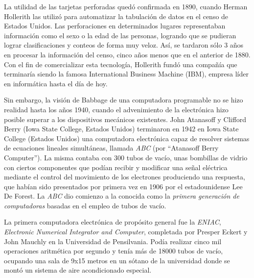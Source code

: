 \documentclass[
]{book}
\begin{document}
La utilidad de las tarjetas perforadas quedó confirmada en 1890, cuando Herman Hollerith las utilizó para automatizar la tabulación de datos en el censo de Estados Unidos. Las perforaciones en determinados lugares representaban información como el sexo o la edad de las personas, logrando que se pudieran lograr clasificaciones y conteos de forma muy veloz. Así, se tardaron sólo 3 años en procesar la información del censo, cinco años menos que en el anterior de 1880. Con el fin de comercializar esta tecnología, Hollerith fundó una compañía que terminaría siendo la famosa International Business Machine (IBM), empresa líder en informática hasta el día de hoy.

Sin embargo, la visión de Babbage de una computadora programable no se hizo realidad hasta los años 1940, cuando el advenimiento de la electrónica hizo posible superar a los dispositivos mecánicos existentes. John Atanasoff y Clifford Berry (Iowa State College, Estados Unidos) terminaron en 1942 en Iowa State College (Estados Unidos) una computadora electrónica capaz de resolver sistemas de ecuaciones lineales simultáneas, llamada \emph{ABC} (por ``Atanasoff Berry Computer''). La misma contaba con 300 tubos de vacío, unas bombillas de vidrio con ciertos componentes que podían recibir y modificar una señal eléctrica mediante el control del movimiento de los electrones produciendo una respuesta, que habían sido presentados por primera vez en 1906 por el estadounidense Lee De Forest. La \emph{ABC} dio comienzo a la conocida como la \emph{primera generación de computadoras} basadas en el empleo de tubos de vacío.

La primera computadora electrónica de propósito general fue la \emph{ENIAC}, \emph{Electronic Numerical Integrator and Computer}, completada por Presper Eckert y John Mauchly en la Universidad de Pensilvania. Podía realizar cinco mil operaciones aritmética por segundo y tenía más de 18000 tubos de vacío, ocupando una sala de 9x15 metros en un sótano de la universidad donde se montó un sistema de aire acondicionado especial.
\end{document}
